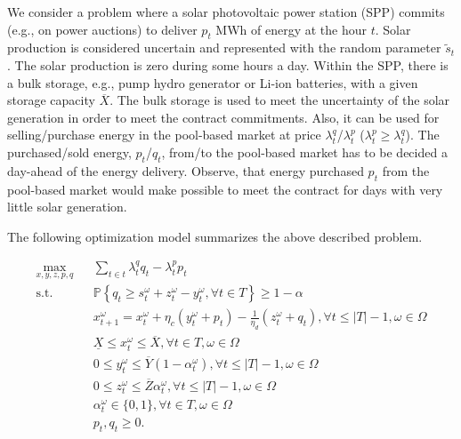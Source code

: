 \documentclass[opre,nonblindrev]{informs3} %
\newcommand{\PP}{\mathbb{P}}
\begin{document}
	We consider a problem where a solar photovoltaic power station (SPP) commits (e.g., on power auctions) to deliver $p_t$ MWh of energy at the hour $t$. Solar production is considered uncertain and represented with the random parameter $\tilde{s}_t$. The solar production is zero during some hours a day.
	Within the SPP, there is a bulk storage, e.g., pump hydro generator or Li-ion batteries, with a given storage capacity $ \overline{X}$. The bulk storage is used to meet the uncertainty of the solar generation in order to meet the contract commitments. Also, it can be used for selling/purchase energy in the pool-based market at price $\lambda_t^q$/$\lambda_t^p$ ($\lambda_t^p \ge \lambda_t^q$). The purchased/sold energy, $p_t$/$q_t$, from/to the pool-based market has to be decided a day-ahead of the energy delivery. Observe, that energy purchased $p_t$ from the pool-based market would make  possible to meet the contract for days with very little solar generation. 
	
	The following optimization model summarizes the above described problem. 

	\begin{subequations} \label{eqn: solar_1}
	\begin{eqnarray}
		\max_{x,y,z,p,q} && \sum_{t \in t} { \lambda_t^q q_t- \lambda^p_t p_t }     \label{eqn: solar_obj} \\
		\mbox{s.t.} &&    \PP \left\{ q_t  \geq s_t^{\omega} + z_t^\omega -  y_t^\omega,  \forall t\in T  \right\} \ge 1-\alpha  \label{eqn. commit} \\
		 && x_{t+1}^\omega = x_t^\omega +  \eta_c (y_t^\omega + p_t) - \frac{1}{\eta_d} (z_t^\omega + q_t),  \forall t \le |T|-1,  \omega \in \Omega       \label{eqn: solar_2}\\
		 &&	 \underline{X} \le x_t^\omega \le \overline{X},  \forall t \in T, \omega \in \Omega 	\label{eqn: solar_3}\\
		 &&   0 \le y_{t}^\omega   \le \overline{Y} (1-\alpha_t^\omega),      \forall t \le |T|-1, \omega \in \Omega  \label{eqn: solar_4} \\
		 &&	 0 \le z_{t}^\omega   \le \overline{Z} \alpha_t^\omega,     \forall t \le |T|-1, \omega \in \Omega  \label{eqn: solar_5} \\
		 && \alpha_t^\omega  \in \{0,1\}, \label{eqn: solar_6} \forall t \in T, \omega \in \Omega \\
		 && p_t, q_t  \ge 0. \label{eqn: solar_7} 
	\end{eqnarray}
	\end{subequations}
\end{document}
